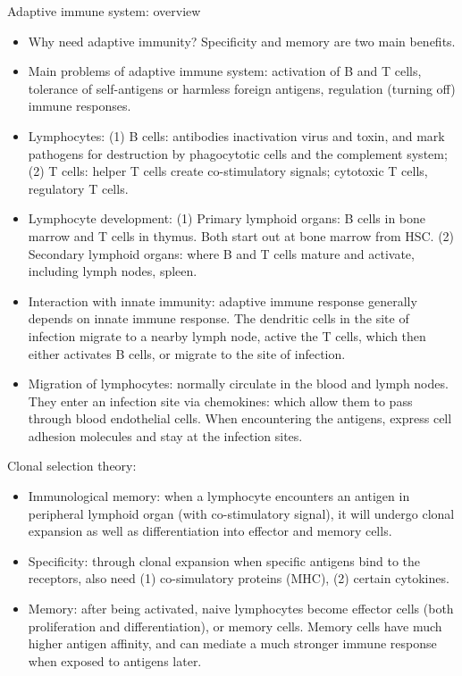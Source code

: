 \documentclass{report}
\begin{document}
Adaptive immune system: overview
\begin{itemize}
	\item Why need adaptive immunity? Specificity and memory are two main benefits. 
	
	\item Main problems of adaptive immune system: activation of B and T cells, tolerance of self-antigens or harmless foreign antigens, regulation (turning off) immune responses. 
	
	\item Lymphocytes: (1) B cells: antibodies inactivation virus and toxin, and mark pathogens for destruction by phagocytotic cells and the complement system; (2) T cells: helper T cells create co-stimulatory signals; cytotoxic T cells, regulatory T cells. 
	
	\item Lymphocyte development: (1) Primary lymphoid organs: B cells in bone marrow and T cells in thymus. Both start out at bone marrow from HSC. (2) Secondary lymphoid organs: where B and T cells mature and activate, including lymph nodes, spleen.   
	
	\item Interaction with innate immunity: adaptive immune response generally depends on innate immune response. The dendritic cells in the site of infection migrate to a nearby lymph node, active the T cells, which then either activates B cells, or migrate to the site of infection. 
	
	\item Migration of lymphocytes: normally circulate in the blood and lymph nodes. They enter an infection site via chemokines: which allow them to pass through blood endothelial cells. When encountering the antigens, express cell adhesion molecules and stay at the infection sites. 
\end{itemize}

Clonal selection theory: 
\begin{itemize}
	\item Immunological memory: when a lymphocyte encounters an antigen in peripheral lymphoid organ (with co-stimulatory signal), it will undergo clonal expansion as well as differentiation into effector and memory cells. 
	
	\item Specificity: through clonal expansion when specific antigens bind to the receptors, also need (1) co-simulatory proteins (MHC), (2) certain cytokines. 
	
	\item Memory: after being activated, naive lymphocytes become effector cells (both proliferation and differentiation), or memory cells. Memory cells have much higher antigen affinity, and can mediate a much stronger immune response when exposed to antigens later. 
\end{itemize}
\end{document}
